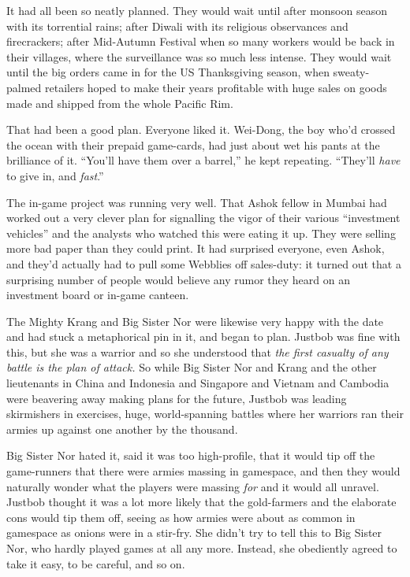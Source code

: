 \tb

It had all been so neatly planned. They would wait until after
monsoon season with its torrential rains; after Diwali with its
religious observances and firecrackers; after Mid-Autumn Festival
when so many workers would be back in their villages, where the
surveillance was so much less intense. They would wait until the
big orders came in for the US Thanksgiving season, when
sweaty-palmed retailers hoped to make their years profitable with
huge sales on goods made and shipped from the whole Pacific Rim.

That had been a good plan. Everyone liked it. Wei-Dong, the boy
who'd crossed the ocean with their prepaid game-cards, had just
about wet his pants at the brilliance of it. ``You'll have them over
a barrel,'' he kept repeating. ``They'll \emph{have} to give in, and
\emph{fast}.''

The in-game project was running very well. That Ashok fellow in
Mumbai had worked out a very clever plan for signalling the vigor
of their various ``investment vehicles'' and the analysts who watched
this were eating it up. They were selling more bad paper than they
could print. It had surprised everyone, even Ashok, and they'd
actually had to pull some Webblies off sales-duty: it turned out
that a surprising number of people would believe any rumor they
heard on an investment board or in-game canteen.

The Mighty Krang and Big Sister Nor were likewise very happy with
the date and had stuck a metaphorical pin in it, and began to plan.
Justbob was fine with this, but she was a warrior and so she
understood that
\emph{the first casualty of any battle is the plan of attack.} So
while Big Sister Nor and Krang and the other lieutenants in China
and Indonesia and Singapore and Vietnam and Cambodia were beavering
away making plans for the future, Justbob was leading skirmishers
in exercises, huge, world-spanning battles where her warriors ran
their armies up against one another by the thousand.

Big Sister Nor hated it, said it was too high-profile, that it
would tip off the game-runners that there were armies massing in
gamespace, and then they would naturally wonder what the players
were massing \emph{for} and it would all unravel. Justbob thought
it was a lot more likely that the gold-farmers and the elaborate
cons would tip them off, seeing as how armies were about as common
in gamespace as onions were in a stir-fry. She didn't try to tell
this to Big Sister Nor, who hardly played games at all any more.
Instead, she obediently agreed to take it easy, to be careful, and
so on.

